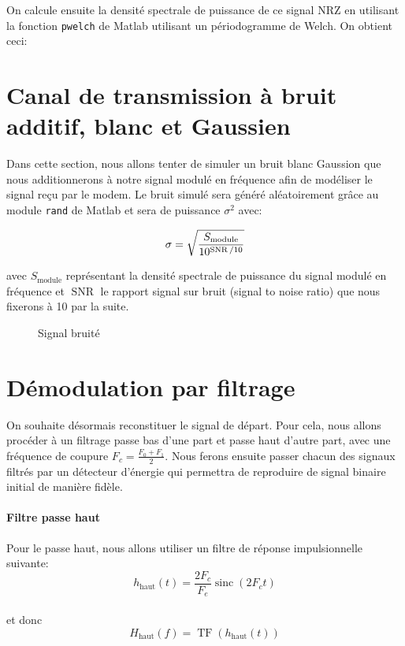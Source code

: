 \documentclass{article}
\newcommand{\TF}{\operatorname{TF}}
\newcommand{\TF}{\operatorname{TF}}
\newcommand{\sinc}{\operatorname{sinc}}
\begin{document}
On calcule ensuite la densité spectrale de puissance de ce signal NRZ en utilisant la fonction \verb|pwelch| de Matlab utilisant un périodogramme de Welch. 
On obtient ceci:




\section{Canal de transmission à bruit additif, blanc et Gaussien}

Dans cette section, nous allons tenter de simuler un bruit blanc Gaussion que nous additionnerons à notre signal modulé en fréquence afin de modéliser le signal reçu par le modem.
Le bruit simulé sera généré aléatoirement grâce au module \verb|rand| de Matlab et sera de puissance $\sigma^2$ avec:

\[
\sigma=\sqrt{\frac{S_\text{module}}{10^{\operatorname{SNR}/10}}} \huge
\]

avec $S_\text{module}$ représentant la densité spectrale de puissance du signal modulé en fréquence et $\operatorname{SNR}$ le rapport signal sur bruit (signal to noise ratio) que nous fixerons à 10 par la suite.

\begin{figure}[H]
	\centering
	
	\caption{Signal bruité}
	\label{fig:bruite}
\end{figure}

\section{Démodulation par filtrage}

On souhaite désormais reconstituer le signal de départ. Pour cela, nous allons procéder à un filtrage passe bas d'une part et passe haut d'autre part, avec une fréquence de coupure $F_c=\frac{F_0+F_1}{2}$. Nous ferons ensuite passer chacun des signaux filtrés par un détecteur d'énergie qui permettra de reproduire de signal binaire initial de manière fidèle.

\paragraph{Filtre passe haut}
Pour le passe haut, nous allons utiliser un filtre de réponse impulsionnelle suivante:
\[
h_\text{haut}(t) = \frac{2 F_c}{F_e} \sinc(2 F_c t)
\]
\\
et donc \[H_\text{haut}(f) = \TF(h_\text{haut}(t))
\]
\end{document}
